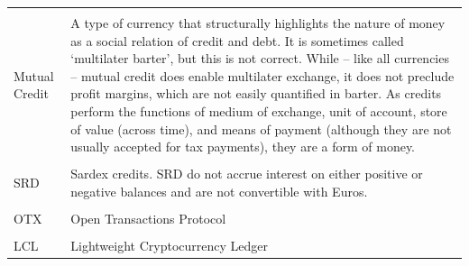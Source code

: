 {\begin{longtable}[]{@{}ll@{}}
\tabularnewline\tabularnewline
\begin{minipage}[t]{0.2\columnwidth}\raggedright\strut
Mutual Credit
\strut
\end{minipage} & \begin{minipage}[t]{0.77\columnwidth}\raggedright\strut
A type of currency that structurally highlights the nature of money as a social relation of credit and debt. It is sometimes called `multilater barter', but this is not correct. While -- like all currencies -- mutual credit does enable multilater exchange, it does not preclude profit margins, which are not easily quantified in barter. As credits perform the functions of medium of exchange, unit of account, store of value (across time), and means of payment (although they are not usually accepted for tax payments), they are a form of money.
\strut
\end{minipage}

\tabularnewline\tabularnewline
\begin{minipage}[t]{0.2\columnwidth}\raggedright\strut
SRD
\strut
\end{minipage} & \begin{minipage}[t]{0.77\columnwidth}\raggedright\strut
Sardex credits. SRD do not accrue interest on either positive or negative balances and are not convertible with Euros.
\strut
\end{minipage}

\tabularnewline\tabularnewline
\begin{minipage}[t]{0.2\columnwidth}\raggedright\strut
OTX
\strut
\end{minipage} & \begin{minipage}[t]{0.77\columnwidth}\raggedright\strut
Open Transactions Protocol
\strut
\end{minipage}

\tabularnewline\tabularnewline
\begin{minipage}[t]{0.2\columnwidth}\raggedright\strut
LCL
\strut
\end{minipage} & \begin{minipage}[t]{0.77\columnwidth}\raggedright\strut
Lightweight Cryptocurrency Ledger
\strut
\end{minipage}

\tabularnewline
\bottomrule
\end{longtable}
}

